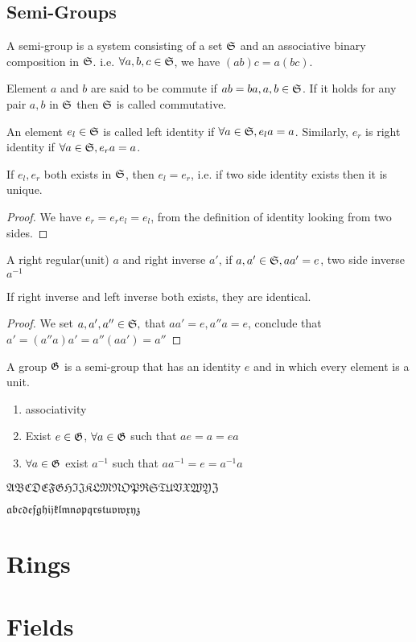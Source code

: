 	\subsection{Semi-Groups}
		\begin{definition}
		A semi-group is a system consisting of a set $\mathfrak{S}$ and an associative binary composition in $\mathfrak{S}$. i.e. $\forall a,b,c \in \mathfrak{S}$, we have $(ab)c=a(bc)$.
		\end{definition}
		\begin{definition}
		Element $a$ and $b$ are said to be commute if $ab=ba, a,b\in\mathfrak{S}$. If it holds for any pair $a,b$ in $\mathfrak{S}$ then $\mathfrak{S}$ is called commutative.
		\end{definition}
		\begin{definition}
		An element $e_l\in\mathfrak{S}$ is called left identity if $\forall a\in\mathfrak{S}, e_la=a$. Similarly, $e_r$ is right identity if $\forall a\in\mathfrak{S}, e_ra=a$.
		\end{definition}
		\begin{theorem}
		If $e_l,e_r$ both exists in $\mathfrak{S}$, then $e_l=e_r$, i.e. if two side identity exists then it is unique.
		\end{theorem}
		\begin{proof}
		We have $e_r=e_re_l=e_l$, from the definition of identity looking from two sides.
		\end{proof}
		\begin{definition}
		A right regular(unit) $a$ and right inverse $a'$, if $a, a'\in\mathfrak{S}, aa'=e$, two side inverse $a^{-1}$
		\end{definition}
		\begin{theorem}
		If right inverse and left inverse both exists, they are identical. 
		\end{theorem}
		\begin{proof}
		We set $a,a',a''\in\mathfrak{S},$ that $aa'=e, a''a=e$, conclude that $a'=(a''a)a'=a''(aa')=a''$
		\end{proof}
		\begin{definition}
		A group $\mathfrak{G}$ is a semi-group that has an identity $e$ and in which every element is a unit.
		\begin{enumerate}
		\item associativity
		\item Exist $e\in\mathfrak{G}$, $\forall a\in\mathfrak{G}$ such that $ae=a=ea$
		\item $\forall a\in\mathfrak{G}$ exist $a^{-1}$ such that $aa^{-1}=e=a^{-1}a$
		\end{enumerate}
		\end{definition}
		
	$\mathfrak{ABCDEFGHIJKLMNOPRSTUVXWYZ}$
	
	$\mathfrak{abcdefghijklmnopqrstuvwxyz}$
	\section{Rings}
	\section{Fields}
	
